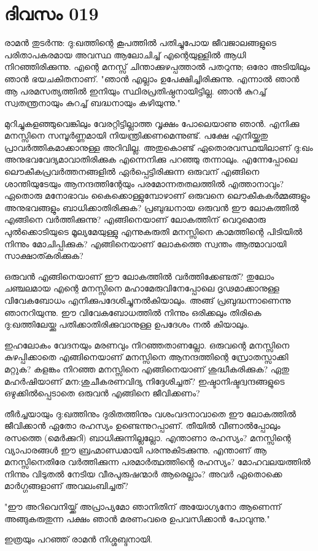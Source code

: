  
\section{ദിവസം 019}


രാമന്‍ തുടര്‍ന്നു: ദു:ഖത്തിന്റെ കൂപത്തില്‍ പതിച്ചുപോയ ജീവജാലങ്ങളുടെ പരിതാപകരമായ അവസ്ഥ ആലോചിച്ച്‌ എന്റെയുള്ളില്‍ ആധി നിറഞ്ഞിരിക്കുന്നു. എന്റെ മനസ്സ്‌ ചിന്താക്കുഴപ്പത്താല്‍ പതറുന്നു; ഒരോ അടിയിലും ഞാന്‍ ഭയചകിതനാണ്‌.  "ഞാന്‍ എല്ലാം ഉപേക്ഷിച്ചിരിക്കുന്നു. എന്നാല്‍ ഞാന്‍ ആ പരമസത്യത്തില്‍ ഇനിയും സ്ഥിരപ്രതിഷ്ഠനായിട്ടില്ല. ഞാന്‍ കുറച്ച്‌ സ്വതന്ത്രനായും കുറച്ച്‌ ബദ്ധനായും കഴിയുന്നു."

മുറിച്ചുകളഞ്ഞുവെങ്കിലും വേരറ്റിട്ടില്ലാത്ത വൃക്ഷം പോലെയാണു ഞാന്‍. എനിക്കു മനസ്സിനെ സമ്പൂര്‍ണ്ണമായി നിയന്ത്രിക്കണമെന്നുണ്ട്‌. പക്ഷേ എനിയ്ക്കതു പ്രാവര്‍ത്തികമാക്കാനുള്ള അറിവില്ല. അതുകൊണ്ട്‌ ഏതൊരവസ്ഥയിലാണ്‌ ദു:ഖം അനുഭവവേദ്യമാവാതിരിക്കുക എന്നെനിക്കു പറഞ്ഞു തന്നാലും. എന്നേപ്പോലെ ലൌകീകപ്രവര്‍ത്തനങ്ങളില്‍ ഏര്‍പ്പെട്ടിരിക്കുന്ന ഒരുവന്‌ എങ്ങിനെ ശാന്തിയുടേയും ആനന്ദത്തിന്റേയും പരമോന്നതതലത്തില്‍ എത്താനാവും? ഏതൊരു മനോഭാവം കൈക്കൊള്ളുമ്പോഴാണ്‌ ഒരുവനെ ലൌകീകകര്‍മ്മങ്ങളും അനുഭവങ്ങളും ബാധിക്കാതിരിക്കുക? പ്രബുദ്ധനായ ഒരുവന്‍ ഈ ലോകത്തില്‍ എങ്ങിനെ  വര്‍ത്തിക്കുന്നു? എങ്ങിനെയാണ്‌ ലോകത്തിന്‌ വെറുമൊരു പുല്‍ക്കൊടിയുടെ മൂല്യമേയുള്ളു എന്നുകരുതി മനസ്സിനെ കാമത്തിന്റെ പിടിയില്‍ നിന്നും മോചിപ്പിക്കുക? എങ്ങിനെയാണ്‌ ലോകത്തെ സ്വന്തം ആത്മാവായി സാക്ഷാത്കരിക്കുക?

ഒരുവന്‍ എങ്ങിനെയാണ്‌ ഈ ലോകത്തില്‍ വര്‍ത്തിക്കേണ്ടത്‌? തുലോം ചഞ്ചലമായ എന്റെ മനസ്സിനെ മഹാമേരുവിനേപ്പോലെ ദൃഢമാക്കാനുള്ള വിവേകബോധം എനിക്കുപദേശിച്ചുനല്‍കിയാലും. അങ്ങ്‌ പ്രബുദ്ധന്നാണെന്നു ഞാനറിയുന്നു. ഈ വിവേകബോധത്തില്‍ നിന്നും ഒരിക്കലും തിരികെ ദു:ഖത്തിലേയ്ക്കു പതിക്കാതിരിക്കുവാനുള്ള ഉപദേശം നല്‍ കിയാലും. 

ഇഹലോകം വേദനയും മരണവും നിറഞ്ഞതാണല്ലോ. ഒരുവന്റെ മനസ്സിനെ കുഴപ്പിക്കാതെ എങ്ങിനെയാണ്‌ മനസ്സിനെ ആനന്ദത്തിന്റെ സ്രോതസ്സാക്കി മറ്റുക? കളങ്കം നിറഞ്ഞ മനസ്സിനെ എങ്ങിനെയാണ്‌ ശുദ്ധീകരിക്കുക? ഏതു മഹര്‍ഷിയാണ്‌ മന:ശുചീകരണവിദ്യ നിദ്ദേശിച്ചത്‌? ഇഷ്ടാനിഷ്ടദ്വന്ദങ്ങളുടെ ഒഴുക്കില്‍പ്പെടാതെ ഒരുവന്‍ എങ്ങിനെ ജീവിക്കണം?

തീര്‍ച്ചയായും ദു:ഖത്തിനും ദുരിതത്തിനും വശംവദനാവാതെ ഈ ലോകത്തില്‍ ജീവിക്കാന്‍ ഏതോ രഹസ്യം ഉണ്ടെന്നുറപ്പാണ്‌. തീയില്‍ വീണാല്‍പ്പോലും രസത്തെ (മെര്‍ക്കുറി)  ബാധിക്കുന്നില്ലല്ലോ. എന്താണാ രഹസ്യം? മനസ്സിന്റെ വ്യാപാരങ്ങള്‍ ഈ ബ്രഹ്മാണ്ഡമായി പരന്നുകിടക്കുന്നു. എന്താണ്‌ ആ മനസ്സിനെതിരേ വര്‍ത്തിക്കുന്ന പരമാര്‍ത്ഥത്തിന്റെ രഹസ്യം? മോഹവലയത്തില്‍ നിന്നും വിടുതല്‍ നേടിയ വീരപുരുഷന്മാര്‍ ആരെല്ലാം? അവര്‍ ഏതൊക്കെ മാര്‍ഗ്ഗങ്ങളാണ്‌ അവലംബിച്ചത്‌? 

"ഈ അറിവെനിയ്ക്ക്‌ അപ്രാപ്യമോ ഞാനിതിന്‌ അയോഗ്യനോ ആണെന്ന്‌ അങ്ങുകരുതുന്ന പക്ഷം ഞാന്‍ മരണംവരെ ഉപവസിക്കാന്‍ പോവുന്നു."

ഇത്രയും പറഞ്ഞ്‌ രാമന്‍ നിശ്ശബ്ദനായി.
